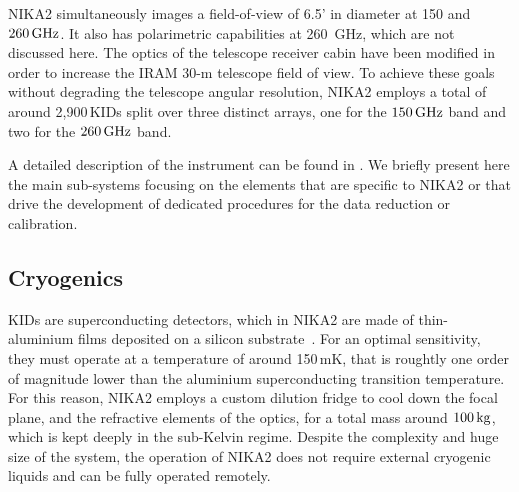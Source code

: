 
NIKA2 simultaneously images a field-of-view of
6.5' in diameter at 150 and $260\,\rm{GHz}$. It also has polarimetric
capabilities at 260~GHz, which are not discussed here. The optics of
the telescope receiver cabin have been modified in order
to increase the IRAM 30-m telescope field of view. To achieve these
goals without degrading the
telescope angular resolution, NIKA2 employs a total of around
2,900\,KIDs split over three distinct arrays, one for the $150\,\rm{GHz}$
band and two for the $260\,\rm{GHz}$ band.

A detailed description of the instrument can be found in
\citet{Adam2018}. We briefly present here the main sub-systems
focusing on the elements that are specific to NIKA2
or that drive the development of dedicated procedures for the data
reduction or calibration.


\subsection{Cryogenics}

{\lp KIDs are superconducting detectors, which in NIKA2 are made of
thin-aluminium films deposited on a silicon substrate~\citep{Roesch2012_LEKID}.
For an optimal sensitivity, they must operate at a temperature of
around 150\,mK, that is roughtly one order of magnitude lower than the
aluminium superconducting transition temperature.}  
For this reason,
NIKA2 employs a custom dilution fridge to cool down the focal plane, and the
refractive elements of the optics, for a total mass around $100\, \rm{kg}$,
which is kept deeply in the sub-Kelvin regime. Despite the complexity
and huge size of the system, the operation of NIKA2 does not require
external cryogenic liquids and can be fully operated remotely.


